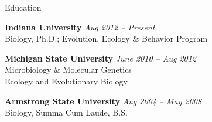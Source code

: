 \documentclass{resume} %
\begin{document}
\thispagestyle{empty}


\begin{rSection}{Education}

  {\bf Indiana University} \hfill {\em Aug 2012 -- Present} \\
  Biology, Ph.D.; Evolution, Ecology \& Behavior Program

  {\bf Michigan State University} \hfill {\em June 2010 -- Aug 2012} \\
  Microbiology \& Molecular Genetics \\
  Ecology and Evolutionary Biology

  {\bf Armstrong State University} \hfill {\em Aug 2004 -- May 2008} \\
  Biology, Summa Cum Laude, B.S.

\end{rSection}

\end{document}
